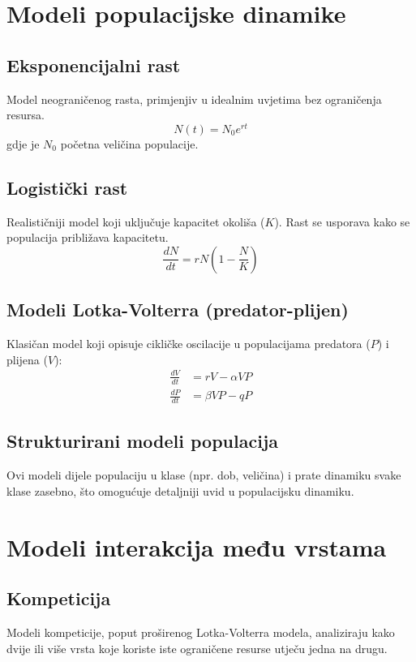 \documentclass[12pt, a4paper]{book}
\begin{document}
	\chapter{Modeli populacijske dinamike}
	
	\section{Eksponencijalni rast}
	Model neograničenog rasta, primjenjiv u idealnim uvjetima bez ograničenja resursa.
	$$ N(t) = N_0 e^{rt} $$
	gdje je $N_0$ početna veličina populacije.
	
	\section{Logistički rast}
	Realističniji model koji uključuje kapacitet okoliša ($K$). Rast se usporava kako se populacija približava kapacitetu.
	$$ \frac{dN}{dt} = rN \left(1 - \frac{N}{K}\right) $$
	
	\section{Modeli Lotka-Volterra (predator-plijen)}
	Klasičan model koji opisuje cikličke oscilacije u populacijama predatora ($P$) i plijena ($V$):
	\begin{align*}
		\frac{dV}{dt} &= rV - \alpha VP \\
		\frac{dP}{dt} &= \beta VP - qP
	\end{align*}
	
	\section{Strukturirani modeli populacija}
	Ovi modeli dijele populaciju u klase (npr. dob, veličina) i prate dinamiku svake klase zasebno, što omogućuje detaljniji uvid u populacijsku dinamiku.
	
	\chapter{Modeli interakcija među vrstama}
	\section{Kompeticija}
	Modeli kompeticije, poput proširenog Lotka-Volterra modela, analiziraju kako dvije ili više vrsta koje koriste iste ograničene resurse utječu jedna na drugu.
	
\end{document}

